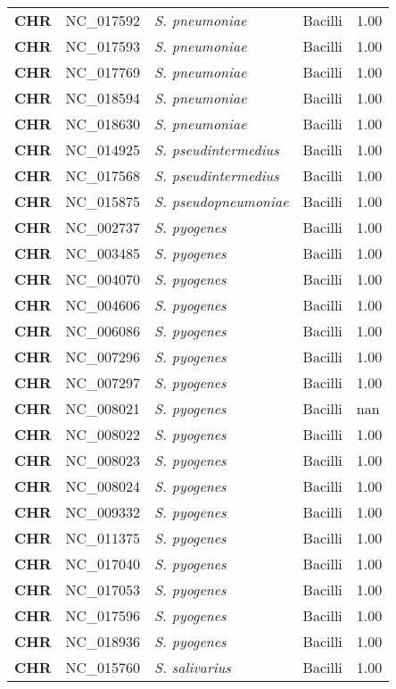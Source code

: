 \begin{adjustwidth}{-3cm}{2cm}
{\begin{supertabular}{>{\bfseries}l|p{0.1\textwidth}p{0.14\textwidth}l|l}
CHR & NC\_017592 & \textit{S. pneumoniae} & Bacilli & 1.00\\
CHR & NC\_017593 & \textit{S. pneumoniae} & Bacilli & 1.00\\
CHR & NC\_017769 & \textit{S. pneumoniae} & Bacilli & 1.00\\
CHR & NC\_018594 & \textit{S. pneumoniae} & Bacilli & 1.00\\
CHR & NC\_018630 & \textit{S. pneumoniae} & Bacilli & 1.00\\
CHR & NC\_014925 & \textit{S. pseudintermedius} & Bacilli & 1.00\\
CHR & NC\_017568 & \textit{S. pseudintermedius} & Bacilli & 1.00\\
CHR & NC\_015875 & \textit{S. pseudopneumoniae} & Bacilli & 1.00\\
CHR & NC\_002737 & \textit{S. pyogenes} & Bacilli & 1.00\\
CHR & NC\_003485 & \textit{S. pyogenes} & Bacilli & 1.00\\
CHR & NC\_004070 & \textit{S. pyogenes} & Bacilli & 1.00\\
CHR & NC\_004606 & \textit{S. pyogenes} & Bacilli & 1.00\\
CHR & NC\_006086 & \textit{S. pyogenes} & Bacilli & 1.00\\
CHR & NC\_007296 & \textit{S. pyogenes} & Bacilli & 1.00\\
CHR & NC\_007297 & \textit{S. pyogenes} & Bacilli & 1.00\\
CHR & NC\_008021 & \textit{S. pyogenes} & Bacilli & nan\\
CHR & NC\_008022 & \textit{S. pyogenes} & Bacilli & 1.00\\
CHR & NC\_008023 & \textit{S. pyogenes} & Bacilli & 1.00\\
CHR & NC\_008024 & \textit{S. pyogenes} & Bacilli & 1.00\\
CHR & NC\_009332 & \textit{S. pyogenes} & Bacilli & 1.00\\
CHR & NC\_011375 & \textit{S. pyogenes} & Bacilli & 1.00\\
CHR & NC\_017040 & \textit{S. pyogenes} & Bacilli & 1.00\\
CHR & NC\_017053 & \textit{S. pyogenes} & Bacilli & 1.00\\
CHR & NC\_017596 & \textit{S. pyogenes} & Bacilli & 1.00\\
CHR & NC\_018936 & \textit{S. pyogenes} & Bacilli & 1.00\\
CHR & NC\_015760 & \textit{S. salivarius} & Bacilli & 1.00\\

\end{supertabular}}
\end{adjustwidth}
